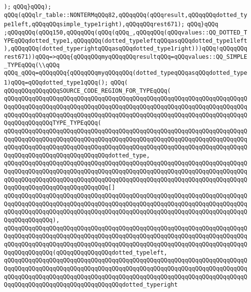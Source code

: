\verb|);|\newline
\verb|qQQq}qQQq);|\newline
\verb|qQQq(qQQqlr_table::NONTERMqQQq82,qQQqqQQq(qQQqresult,qQQqqQQqdotted_type1left,qQQqqQQqsimple_type1right),qQQqqQQqrest671);|\newline
\verb|qQQq}qQQq|\newline
\verb|;qQQqqQQq(qQQq150,qQQqqQQq(qQQq(qQQq_,qQQqqQQq(qQQqvalues::QQ_DOTTED_TYPEqQQqdotted_type1,qQQqqQQq(dotted_typeleftqQQqasqQQqdotted_type1left),qQQqqQQq(dotted_typerightqQQqasqQQqdotted_type1right)))qQQq!qQQqqQQqrest671))qQQq=>qQQq{qQQqqQQqmyqQQqqQQqresultqQQq=qQQqvalues::QQ_SIMPLE_TYPEqQQq(\\qQQq|\newline
\verb|qQQq_qQQq=qQQqqQQq{qQQqqQQqmyqQQqqQQq(dotted_typeqQQqasqQQqdotted_type1)qQQq=qQQqdotted_type1qQQq();|\newline
\verb|qQQq(|\newline
\verb|qQQqqQQqqQQqqQQqSOURCE_CODE_REGION_FOR_TYPEqQQq(|\newline
\verb|qQQqqQQqqQQqqQQqqQQqqQQqqQQqqQQqqQQqqQQqqQQqqQQqqQQqqQQqqQQqqQQqqQQqqQQqqQQqqQQqqQQqqQQqqQQqqQQqqQQqqQQqqQQqqQQqqQQqqQQqqQQqqQQqqQQqqQQqqQQqqQQqqQQqqQQqqQQqqQQqqQQqqQQqqQQqqQQqqQQqqQQqqQQqqQQqqQQqqQQqqQQqqQQqqQQqqQQqqQQqqQQqTYPE_TYPEqQQq(|\newline
\verb|qQQqqQQqqQQqqQQqqQQqqQQqqQQqqQQqqQQqqQQqqQQqqQQqqQQqqQQqqQQqqQQqqQQqqQQqqQQqqQQqqQQqqQQqqQQqqQQqqQQqqQQqqQQqqQQqqQQqqQQqqQQqqQQqqQQqqQQqqQQqqQQqqQQqqQQqqQQqqQQqqQQqqQQqqQQqqQQqqQQqqQQqqQQqqQQqqQQqqQQqqQQqqQQqqQQqqQQqqQQqqQQqqQQqqQQqqQQqqQQqdotted_type,|\newline
\verb|qQQqqQQqqQQqqQQqqQQqqQQqqQQqqQQqqQQqqQQqqQQqqQQqqQQqqQQqqQQqqQQqqQQqqQQqqQQqqQQqqQQqqQQqqQQqqQQqqQQqqQQqqQQqqQQqqQQqqQQqqQQqqQQqqQQqqQQqqQQqqQQqqQQqqQQqqQQqqQQqqQQqqQQqqQQqqQQqqQQqqQQqqQQqqQQqqQQqqQQqqQQqqQQqqQQqqQQqqQQqqQQqqQQqqQQqqQQqqQQq[]|\newline
\verb|qQQqqQQqqQQqqQQqqQQqqQQqqQQqqQQqqQQqqQQqqQQqqQQqqQQqqQQqqQQqqQQqqQQqqQQqqQQqqQQqqQQqqQQqqQQqqQQqqQQqqQQqqQQqqQQqqQQqqQQqqQQqqQQqqQQqqQQqqQQqqQQqqQQqqQQqqQQqqQQqqQQqqQQqqQQqqQQqqQQqqQQqqQQqqQQqqQQqqQQqqQQqqQQqqQQqqQQqqQQqqQQq),|\newline
\verb|qQQqqQQqqQQqqQQqqQQqqQQqqQQqqQQqqQQqqQQqqQQqqQQqqQQqqQQqqQQqqQQqqQQqqQQqqQQqqQQqqQQqqQQqqQQqqQQqqQQqqQQqqQQqqQQqqQQqqQQqqQQqqQQqqQQqqQQqqQQqqQQqqQQqqQQqqQQqqQQqqQQqqQQqqQQqqQQqqQQqqQQqqQQqqQQqqQQqqQQqqQQqqQQqqQQqqQQqqQQqqQQq(qQQqqQQqqQQqqQQqdotted_typeleft,|\newline
\verb|qQQqqQQqqQQqqQQqqQQqqQQqqQQqqQQqqQQqqQQqqQQqqQQqqQQqqQQqqQQqqQQqqQQqqQQqqQQqqQQqqQQqqQQqqQQqqQQqqQQqqQQqqQQqqQQqqQQqqQQqqQQqqQQqqQQqqQQqqQQqqQQqqQQqqQQqqQQqqQQqqQQqqQQqqQQqqQQqqQQqqQQqqQQqqQQqqQQqqQQqqQQqqQQqqQQqqQQqqQQqqQQqqQQqqQQqqQQqqQQqqQQqdotted_typeright|\newline
